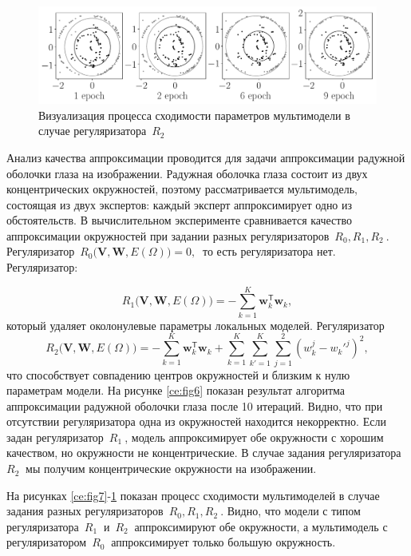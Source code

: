 \begin{figure}
\center
     \includegraphics[width=\textwidth]{results/priorexpertfig/experiment_real_regular}
     \caption{Визуализация процесса сходимости параметров мультимодели в случае регуляризатора~$ R_2~$}
    \label{ce:fig9}
\end{figure}

Анализ качества аппроксимации проводится для задачи аппроксимации радужной оболочки глаза на изображении. Радужная оболочка глаза состоит из двух концентрических окружностей, поэтому рассматривается мультимодель, состоящая из двух экспертов: каждый эксперт аппроксимирует одно из обстоятельств. В вычислительном эксперименте сравнивается качество аппроксимации окружностей при задании разных регуляризаторов~$ R_0, R_1, R_2~$. Регуляризатор~$ R_0 \bigl(\mathbf{V}, \mathbf{W}, E(\Omega) \bigr) = 0,~$ то есть регуляризатора нет. Регуляризатор:

\[
R_1\bigl(\mathbf{V}, \mathbf{W}, E(\Omega)\bigr)= -\sum_{k=1}^{K}\mathbf{w}_k^{\mathsf{T}}\mathbf{w}_k,
\]
который удаляет околонулевые параметры локальных моделей.
Регуляризатор
\[
R_2\bigl(\mathbf{V}, \mathbf{W}, E(\Omega)\bigr)= -\sum_{k=1}^{K}\mathbf{w}_k^{\mathsf{T}}\mathbf{w}_k + \sum_{k=1}^{K}\sum_{k'=1}^{K}\sum_{j=1}^2\left(w_k^j-w_k'^j\right)^2,
\]
что способствует совпадению центров окружностей и близким к нулю параметрам модели.
На рисунке \ref{ce:fig6} показан результат алгоритма аппроксимации радужной оболочки глаза после 10 итераций. Видно, что при отсутствии регуляризатора одна из окружностей находится некорректно. Если задан регуляризатор~$ R_1~$, модель аппроксимирует обе окружности с хорошим качеством, но окружности не концентрические. В случае задания регуляризатора~$ R_2~$ мы получим концентрические окружности на изображении.

На рисунках \ref{ce:fig7}-\ref{ce:fig9} показан процесс сходимости мультимоделей в случае задания разных регуляризаторов~$ R_0, R_1, R_2~$. Видно, что модели с типом регуляризатора~$ R_1~$ и~$ R_2~$ аппроксимируют обе окружности, а мультимодель с регуляризатором~$ R_0~$ аппроксимирует только большую окружность.
